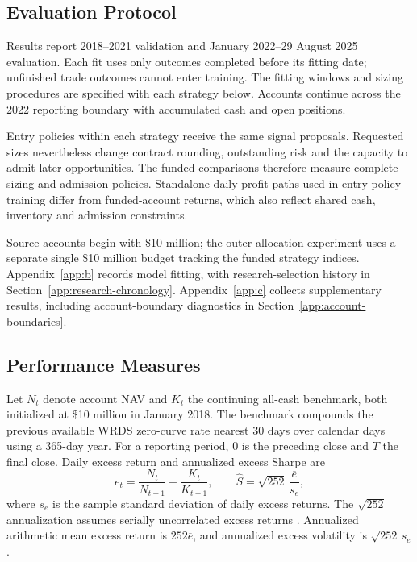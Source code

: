 \subsection{Evaluation Protocol}\label{sec:evaluation-protocol}
Results report 2018--2021 validation and January 2022--29 August 2025 evaluation. Each fit uses only outcomes completed before its fitting date; unfinished trade outcomes cannot enter training. The fitting windows and sizing procedures are specified with each strategy below. Accounts continue across the 2022 reporting boundary with accumulated cash and open positions.

Entry policies within each strategy receive the same signal proposals. Requested sizes nevertheless change contract rounding, outstanding risk and the capacity to admit later opportunities. The funded comparisons therefore measure complete sizing and admission policies. Standalone daily-profit paths used in entry-policy training differ from funded-account returns, which also reflect shared cash, inventory and admission constraints.

Source accounts begin with \$10 million; the outer allocation experiment uses a separate single \$10 million budget tracking the funded strategy indices. Appendix~\ref{app:b} records model fitting, with research-selection history in Section~\ref{app:research-chronology}. Appendix~\ref{app:c} collects supplementary results, including account-boundary diagnostics in Section~\ref{app:account-boundaries}.

\subsection{Performance Measures}\label{sec:performance-measures}

Let \(N_t\) denote account NAV and \(K_t\) the continuing all-cash benchmark, both initialized at \$10 million in January 2018. The benchmark compounds the previous available WRDS zero-curve rate nearest 30 days over calendar days using a 365-day year. For a reporting period, \(0\) is the preceding close and \(T\) the final close. Daily excess return and annualized excess Sharpe are
\begin{equation*}
e_t=\frac{N_t}{N_{t-1}}-\frac{K_t}{K_{t-1}},\qquad
\widehat S=\sqrt{252}\,\frac{\overline e}{s_e},
\end{equation*}
where \(s_e\) is the sample standard deviation of daily excess returns. The \(\sqrt{252}\) annualization assumes serially uncorrelated excess returns \cite{lo2002statistics}. Annualized arithmetic mean excess return is \(252\overline e\), and annualized excess volatility is \(\sqrt{252}\,s_e\).

